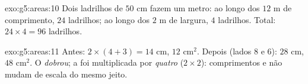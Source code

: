 \begin{solution}{exo:g5:areas:10}
Dois ladrilhos de $50$ cm fazem um metro: ao longo dos $12$ m de
comprimento, $24$ ladrilhos; ao longo dos $2$ m de largura, $4$
ladrilhos. Total: $24 \times 4 = 96$ ladrilhos.
\end{solution}

\begin{solution}{exo:g5:areas:11}
Antes:  $2 \times (4 + 3) = 14$ cm,  $12$ cm$^2$.
Depois (lados $8$ e $6$):  $28$ cm,  $48$ cm$^2$. O
 \emph{dobrou}; a  foi multiplicada por \emph{quatro}
($2 \times 2$): comprimentos e  não mudam de escala do mesmo
jeito.
\end{solution}
